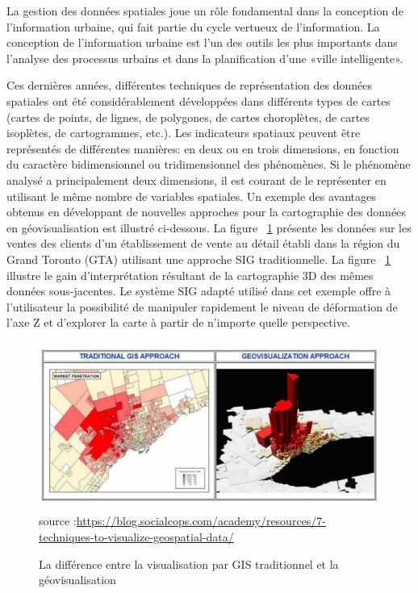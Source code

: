 \documentclass[french, a4paper, 12pt]{report}
\begin{document}
La gestion des données spatiales joue un rôle fondamental dans la conception de l’information urbaine, qui fait partie du cycle vertueux de l’information. La conception de l'information urbaine est l'un des outils les plus importants dans l'analyse des processus urbains et dans la planification d'une «ville intelligente».

Ces dernières années, différentes techniques de représentation des données spatiales ont été considérablement développées dans différents types de cartes (cartes de points, de lignes, de polygones, de cartes choroplètes, de cartes isoplètes, de cartogrammes, etc.). Les indicateurs spatiaux peuvent être représentés de différentes manières: en deux ou en trois dimensions, en fonction du caractère bidimensionnel ou tridimensionnel des phénomènes. Si le phénomène analysé a principalement deux dimensions, il est courant de le représenter en utilisant le même nombre de variables spatiales.
Un exemple des avantages obtenus en développant de nouvelles approches pour la cartographie des données en géovisualisation est illustré ci-dessous. La figure ~\ref{fig:1.12} présente les données sur les ventes des clients d'un établissement de vente au détail établi dans la région du Grand Toronto (GTA) utilisant une approche SIG traditionnelle. La figure ~\ref{fig:1.12} illustre le gain d'interprétation résultant de la cartographie 3D des mêmes données sous-jacentes. Le système SIG adapté utilisé dans cet exemple offre à l'utilisateur la possibilité de manipuler rapidement le niveau de déformation de l'axe Z et d'explorer la carte à partir de n'importe quelle perspective.
\begin{figure}[!ht]
    \centering
    \includegraphics[height=5.5cm]{images/geo1.jpg}
    \scriptsize{source :\url{https://blog.socialcops.com/academy/resources/7-techniques-to-visualize-geospatial-data/}}
    \caption{La différence entre la visualisation par GIS traditionnel et la géovisualisation }
    \label{fig:1.12}
\end{figure}
\end{document}
